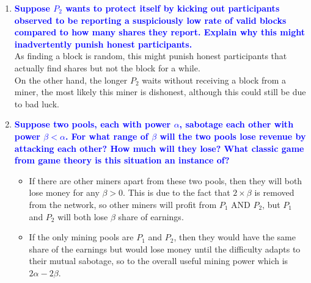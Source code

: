 \documentclass[11pt]{article}
\begin{document}
\begin{enumerate}
\begin{enumerate}
    \item \textbf{\textcolor{blue}{Suppose $P_2$ wants to protect itself by kicking out participants observed to be reporting a suspiciously low rate of valid blocks compared to how many shares they report. Explain why this might inadvertently punish honest participants.}}
        \\ As finding a block is random, this might punish honest participants that actually find shares but not the block for a while. 
        \\ On the other hand, the longer $P_2$ waits without receiving a block from a miner, the most likely this miner is dishonest, although this could still be due to bad luck.
        
    \item \textbf{\textcolor{blue}{Suppose two pools, each with power $\alpha$, sabotage each other with power $\beta < \alpha$. For what range of $\beta$ will the two pools lose revenue by attacking each other? How much will they lose? What classic game from game theory is this situation an instance of?}}
        \begin{itemize}
            \item If there are other miners apart from these two pools, then they will both lose money for any $\beta > 0$. This is due to the fact that $2 \times \beta$ is removed from the network, so other miners will profit from $P_1$ AND $P_2$, but $P_1$ and $P_2$ will both lose $\beta$ share of earnings.
            \item If the only mining pools are $P_1$ and $P_2$, then they would have the same share of the earnings but would lose money until the difficulty adapts to their mutual sabotage, so to the overall useful mining power which is $2 \alpha - 2 \beta$.
        \end{itemize}
    \end{enumerate}
\end{enumerate}
\end{document}
